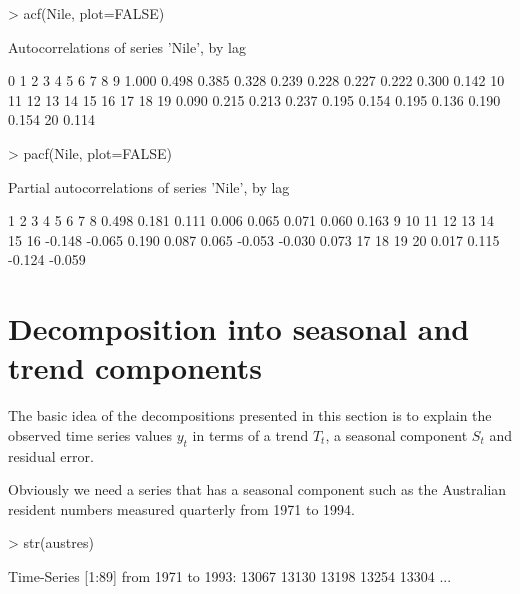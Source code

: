 \begin{Schunk}
\begin{Sinput}
> acf(Nile, plot=FALSE) 
\end{Sinput}
\begin{Soutput}

Autocorrelations of series 'Nile', by lag

    0     1     2     3     4     5     6     7     8     9 
1.000 0.498 0.385 0.328 0.239 0.228 0.227 0.222 0.300 0.142 
   10    11    12    13    14    15    16    17    18    19 
0.090 0.215 0.213 0.237 0.195 0.154 0.195 0.136 0.190 0.154 
   20 
0.114 
\end{Soutput}
\begin{Sinput}
> pacf(Nile, plot=FALSE) 
\end{Sinput}
\begin{Soutput}

Partial autocorrelations of series 'Nile', by lag

     1      2      3      4      5      6      7      8 
 0.498  0.181  0.111  0.006  0.065  0.071  0.060  0.163 
     9     10     11     12     13     14     15     16 
-0.148 -0.065  0.190  0.087  0.065 -0.053 -0.030  0.073 
    17     18     19     20 
 0.017  0.115 -0.124 -0.059 
\end{Soutput}
\end{Schunk}

 
\section{Decomposition into seasonal and trend components} 
 
The basic idea of the decompositions presented in this section is to explain the observed time series values $y_t$ in terms of a trend $T_t$, a seasonal component $S_t$ and residual error. 
 
Obviously we need a series that has a seasonal component such as the Australian resident numbers measured quarterly from  1971 to 1994. 

\begin{Schunk}
\begin{Sinput}
> str(austres) 
\end{Sinput}
\begin{Soutput}
 Time-Series [1:89] from 1971 to 1993: 13067 13130 13198 13254 13304 ...
\end{Soutput}
\end{Schunk}

